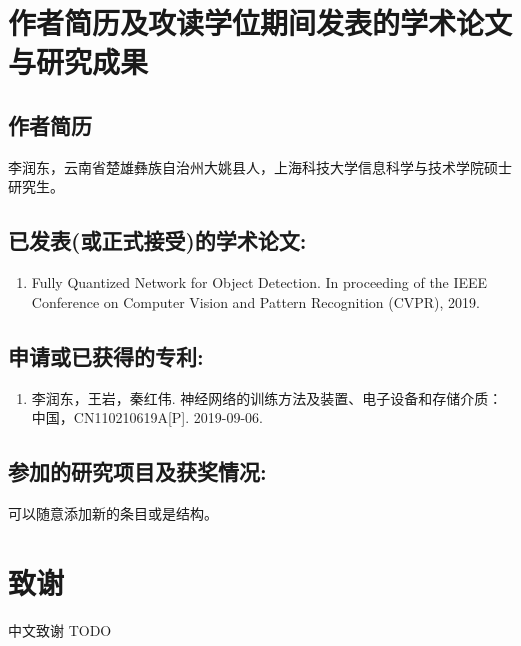 \chapter{作者简历及攻读学位期间发表的学术论文与研究成果}

\section*{作者简历}
李润东，云南省楚雄彝族自治州大姚县人，上海科技大学信息科学与技术学院硕士研究生。

\section*{已发表(或正式接受)的学术论文:}
{
\setlist[enumerate]{}
\begin{enumerate}[nosep]
    \item Fully Quantized Network for Object Detection. In proceeding of the IEEE Conference on Computer Vision and Pattern Recognition (CVPR), 2019.
\end{enumerate}
}

\section*{申请或已获得的专利:}
{
\setlist[enumerate]{}
\begin{enumerate}[nosep]
    \item 李润东，王岩，秦红伟. 神经网络的训练方法及装置、电子设备和存储介质：中国，CN110210619A[P]. 2019-09-06.
\end{enumerate}
}

\section*{参加的研究项目及获奖情况:}

可以随意添加新的条目或是结构。

\chapter[致谢]{致\quad 谢}%
\thispagestyle{noheaderstyle}%
中文致谢 TODO

\cleardoublepage[plain]%

